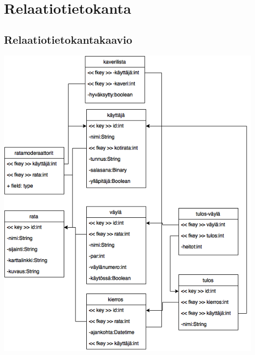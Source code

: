 \documentclass[10pt,a4paper]{article}
\begin{document}
\section{Relaatiotietokanta}
\subsection{Relaatiotietokantakaavio}
\includegraphics[scale=0.6]{tsoha_relaatiotietokantakaavio	}
\end{document}
